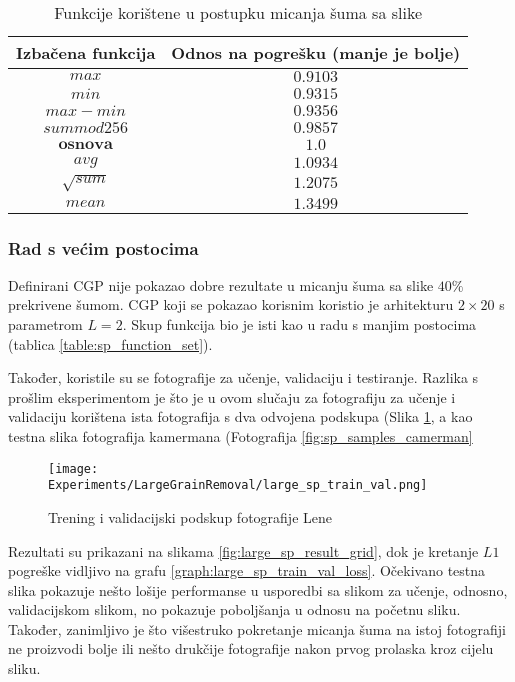 \begin{table}
	\centering
	\begin{tabular}{||c c||}
		\hline
		Izbačena funkcija & Odnos na pogrešku (manje je bolje)\\ [0.5ex]
		\hline \hline
		$max$ & $0.9103$\\ 
		$min$ & $0.9315$\\ 
		$max - min$ & $0.9356$\\ 
		$sum mod 256$ & $0.9857$\\ 
		$\bm{osnova}$ & $\bm{1.0}$\\ 
		$avg$ & $1.0934$\\ 
		$\sqrt{sum}$ & $1.2075$\\ 
		$mean$ & $1.3499$\\ [1ex]
		\hline
	\end{tabular}
	\caption{Funkcije korištene u postupku micanja šuma sa slike}
	\label{table:sp_function_quality}
\end{table}

\subsubsection{Rad s većim postocima}
Definirani CGP nije pokazao dobre rezultate u micanju šuma sa slike $40\%$ prekrivene šumom.
CGP koji se pokazao korisnim koristio je arhitekturu $2 \times 20$ s parametrom $L = 2$.
Skup funkcija bio je isti kao u radu s manjim postocima (tablica \ref{table:sp_function_set}).

Također, koristile su se fotografije za učenje, validaciju i testiranje.
Razlika s prošlim eksperimentom je što je u ovom slučaju za fotografiju za učenje i validaciju korištena ista fotografija s dva odvojena podskupa (Slika \ref{fig:large_sp_train_val_illustration}, a kao testna slika fotografija kamermana (Fotografija \ref{fig:sp_samples_camerman}

\begin{figure}
	\centering
	\texttt{[image: Experiments/LargeGrainRemoval/large\_sp\_train\_val.png]}
	\caption{Trening i validacijski podskup fotografije Lene}
	\label{fig:large_sp_train_val_illustration}
\end{figure}

Rezultati su prikazani na slikama \ref{fig:large_sp_result_grid}, dok je kretanje $L1$ pogreške vidljivo na grafu \ref{graph:large_sp_train_val_loss}.
Očekivano testna slika pokazuje nešto lošije performanse u usporedbi sa slikom za učenje, odnosno, validacijskom slikom, no pokazuje poboljšanja u odnosu na početnu sliku.
Također, zanimljivo je što višestruko pokretanje micanja šuma na istoj fotografiji ne proizvodi bolje ili nešto drukčije fotografije nakon prvog prolaska kroz cijelu sliku.

